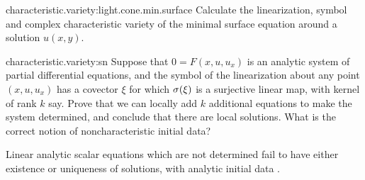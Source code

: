 \begin{problem}{characteristic.variety:light.cone.min.surface}
Calculate the linearization, symbol and complex characteristic variety of the minimal surface equation around a solution \(u(x,y)\).
\end{problem}
\begin{problem}{characteristic.variety:sn}
Suppose that \(0=F(x,u,u_x)\) is an analytic system of partial differential equations, and the symbol of the linearization about any point \((x,u,u_x)\) has a covector \(\xi\) for which \(\opsymbol[]{\xi}\) is a surjective linear map, with kernel of rank \(k\) say.
Prove that we can locally add \(k\) additional equations to make the system determined, and conclude that there are local solutions.
What is the correct notion of noncharacteristic initial data?
\end{problem}
Linear analytic scalar equations which are not determined fail to have either existence or uniqueness of solutions, with analytic initial data \cite{Kitagawa:1990}. 
